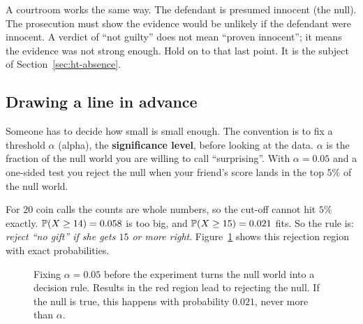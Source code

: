 A courtroom works the same way. The defendant is presumed innocent (the null).
The prosecution must show the evidence would be unlikely if the defendant were
innocent. A verdict of ``not guilty'' does not mean ``proven innocent''; it means the
evidence was not strong enough. Hold on to that last point. It is the subject of
Section~\ref{sec:ht-absence}.

\subsection{Drawing a line in advance}

Someone has to decide how small is small enough. The convention is to fix a
threshold $\alpha$ (alpha), the \textbf{significance level}, before looking at the
data. $\alpha$ is the fraction of the null world you are willing to call
``surprising''. With $\alpha = 0.05$ and a one-sided test you reject the null when
your friend's score lands in the top $5\%$ of the null world.

For $20$ coin calls the counts are whole numbers, so the cut-off cannot hit $5\%$
exactly. $\P(X\ge 14) = 0.058$ is too big, and $\P(X\ge 15) = 0.021$ fits. So the
rule is: \emph{reject ``no gift'' if she gets $15$ or more right}.
Figure~\ref{fig:ht-threshold} shows this rejection region with exact probabilities.

\begin{figure}[H]
\centering
{}
\caption{Fixing $\alpha=0.05$ before the experiment turns the null world into a
decision rule. Results in the red region lead to rejecting the null. If the null is
true, this happens with probability $0.021$, never more than $\alpha$.}
\label{fig:ht-threshold}
\end{figure}


